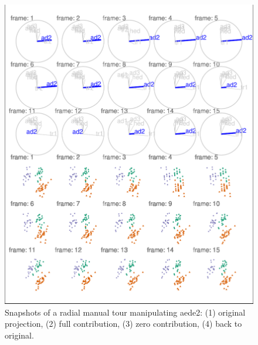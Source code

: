 \begin{Schunk}
\begin{figure}

{\centering \includegraphics[width=1\linewidth]{spinifex_paper_files/figure-latex/step3-1} 

}

\caption[Snapshots of a radial manual tour manipulating aede2]{Snapshots of a radial manual tour manipulating aede2: (1) original projection, (2) full contribution, (3) zero contribution, (4) back to original. }\label{fig:step3}
\end{figure}
\end{Schunk}

